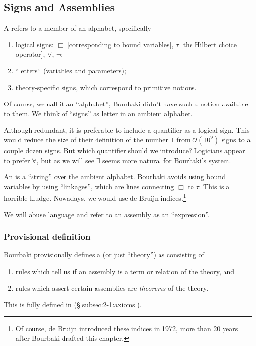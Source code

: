 \subsection{Signs and Assemblies}

\begin{definition}
A  refers to a member of an alphabet, specifically
\begin{enumerate}
\item logical signs: $\Box$ [corresponding to bound variables], $\tau$ [the Hilbert choice operator], $\lor$, $\neg$;
\item ``letters'' (variables and parameters);
\item theory-specific signs, which correspond to primitive notions.
\end{enumerate}
Of course, we call it an ``alphabet'', Bourbaki didn't have such a
notion available to them. We think of ``signs'' as letter in an ambient alphabet.
\end{definition}

\begin{puzzle}
Although redundant, it is preferable to include a quantifier as a
logical sign. This would reduce the size of their definition of the
number $1$ from $\mathcal{O}(10^{9})$
signs to a couple dozen signs. But which quantifier should we introduce?
Logicians appear to prefer $\forall$, but as we will see $\exists$ seems
more natural for Bourbaki's system.
\end{puzzle}

\begin{definition}
An  is a ``string'' over the ambient alphabet. Bourbaki
avoids using bound variables by using ``linkages'', which are lines
connecting $\Box$ to $\tau$. This is a horrible kludge. Nowadays, we
would use de Bruijn indices.\footnote{Of course, de Bruijn introduced
these indices in 1972, more than 20 years after Bourbaki drafted this chapter.}

We will abuse language and refer to an assembly as an ``expression''.
\end{definition}

\subsubsection{Provisional definition}
Bourbaki provisionally defines a  (or just
``theory'') as consisting of
\begin{enumerate}
\item rules which tell us if an assembly is a term or relation of the
  theory, and
\item rules which assert certain assemblies are \emph{theorems} of the theory.
\end{enumerate}
This is fully defined in (\S\ref{subsec:2-1:axioms}).

